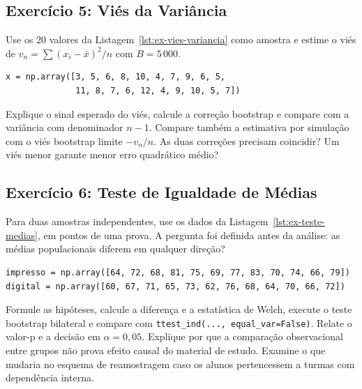 \documentclass[12pt,a4paper]{article}
\begin{document}
\subsection*{Exercício 5: Viés da Variância}
Use os 20 valores da Listagem~\ref{lst:ex-vies-variancia} como amostra e estime o viés de $v_n=\sum(x_i-\bar x)^2/n$ com $B=5\,000$.
\begin{lstlisting}[caption={Dados do Exercicio 5.},label={lst:ex-vies-variancia}]
x = np.array([3, 5, 6, 8, 10, 4, 7, 9, 6, 5,
              11, 8, 7, 6, 12, 4, 9, 10, 5, 7])
\end{lstlisting}
Explique o sinal esperado do viés, calcule a correção bootstrap e compare com a variância com denominador $n-1$. Compare também a estimativa por simulação com o viés bootstrap limite $-v_n/n$. As duas correções precisam coincidir? Um viés menor garante menor erro quadrático médio?

\subsection*{Exercício 6: Teste de Igualdade de Médias}
Para duas amostras independentes, use os dados da Listagem~\ref{lst:ex-teste-medias}, em pontos de uma prova. A pergunta foi definida antes da análise: as médias populacionais diferem em qualquer direção?
\begin{lstlisting}[caption={Dados do Exercicio 6.},label={lst:ex-teste-medias}]
impresso = np.array([64, 72, 68, 81, 75, 69, 77, 83, 70, 74, 66, 79])
digital = np.array([60, 67, 71, 65, 73, 62, 76, 68, 64, 70, 66, 72])
\end{lstlisting}
Formule as hipóteses, calcule a diferença e a estatística de Welch, execute o teste bootstrap bilateral e compare com \texttt{ttest\_ind(..., equal\_var=False)}. Relate o valor-p e a decisão em $\alpha=0{,}05$. Explique por que a comparação observacional entre grupos não prova efeito causal do material de estudo. Examine o que mudaria no esquema de reamostragem caso os alunos pertencessem a turmas com dependência interna.
\end{document}
